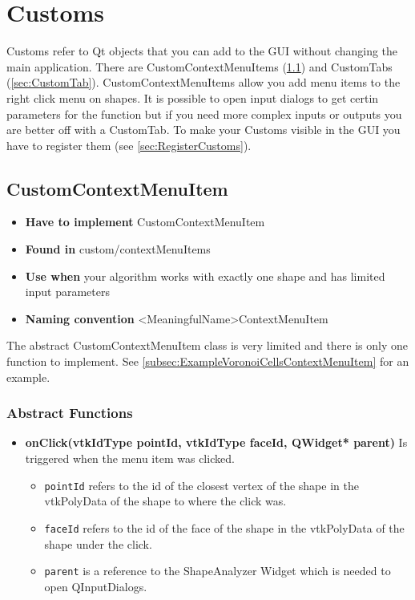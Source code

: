 
\chapter{Customs}

Customs refer to Qt objects that you can add to the GUI without changing the main application. There are CustomContextMenuItems (\ref{sec:CustomContextMenuItem}) and CustomTabs (\ref{sec:CustomTab}). CustomContextMenuItems allow you add menu items to the right click menu on shapes. It is possible to open input dialogs to get certin parameters for the function but if you need more complex inputs or outputs you are better off with a CustomTab. To make your Customs visible in the GUI you have to register them (see \ref{sec:RegisterCustoms}).

\section{CustomContextMenuItem}
\label{sec:CustomContextMenuItem}

\begin{itemize}
	\item \textbf{Have to implement} CustomContextMenuItem
	\item \textbf{Found in} custom/contextMenuItems
	\item \textbf{Use when} your algorithm works with exactly one shape and has limited input parameters
	\item\textbf{Naming convention} <MeaningfulName>ContextMenuItem
\end{itemize}

The abstract CustomContextMenuItem class is very limited and there is only one function to implement. See \ref{subsec:ExampleVoronoiCellsContextMenuItem} for an example. 

\subsection{Abstract Functions}

\begin{itemize}
	\item \textbf{onClick(vtkIdType pointId, vtkIdType faceId, QWidget* parent)} Is triggered when the menu item was clicked. 
	\begin{itemize}
		\item \texttt{pointId} refers to the id of the closest vertex of the shape in the vtkPolyData of the shape to where the click was. 
		\item \texttt{faceId} refers to the id of the face of the shape in the vtkPolyData of the shape under the click. 
		\item \texttt{parent} is a reference to the ShapeAnalyzer Widget which is needed to open QInputDialogs.
	\end{itemize}
\end{itemize}

